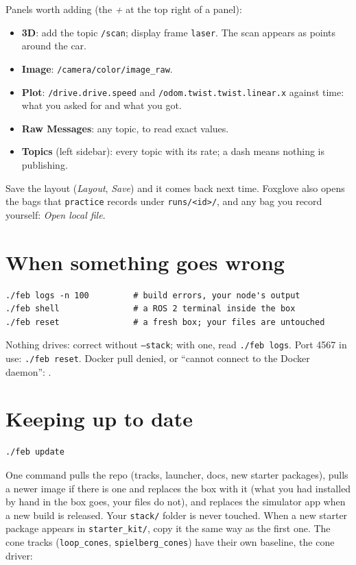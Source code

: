 Panels worth adding (the \emph{+} at the top right of a panel):
\begin{itemize}
  \item \textbf{3D}: add the topic \texttt{/scan}; display frame \texttt{laser}. The scan appears as points around the car.
  \item \textbf{Image}: \texttt{/camera/color/image\_raw}.
  \item \textbf{Plot}: \texttt{/drive.drive.speed} and \texttt{/odom.twist.twist.linear.x} against time: what you asked for and what you got.
  \item \textbf{Raw Messages}: any topic, to read exact values.
  \item \textbf{Topics} (left sidebar): every topic with its rate; a dash means nothing is publishing.
\end{itemize}

Save the layout (\emph{Layout}, \emph{Save}) and it comes back next time. Foxglove also opens the
bags that \texttt{practice} records under \texttt{runs/<id>/}, and any bag you record yourself:
\emph{Open local file}.

\section{When something goes wrong}

\begin{lstlisting}
./feb logs -n 100         # build errors, your node's output
./feb shell               # a ROS 2 terminal inside the box
./feb reset               # a fresh box; your files are untouched
\end{lstlisting}

Nothing drives: correct without \texttt{--stack}; with one, read \texttt{./feb logs}.
Port 4567 in use: \texttt{./feb reset}. Docker pull denied, or ``cannot connect to the Docker daemon'': \OSdockerfix.

\section{Keeping up to date}

\begin{lstlisting}
./feb update
\end{lstlisting}

One command pulls the repo (tracks, launcher, docs, new starter packages), pulls a newer image
if there is one and replaces the box with it (what you had installed by hand in the box goes,
your files do not), and replaces the simulator app when a new build is released. Your
\texttt{stack/} folder is never touched. When a new starter package appears in
\texttt{starter\_kit/}, copy it the same way as the first one. The cone tracks
(\texttt{loop\_cones}, \texttt{spielberg\_cones}) have their own baseline, the cone driver:

